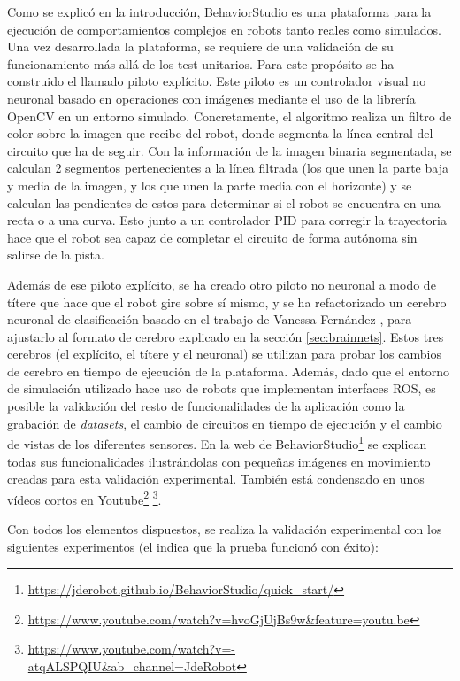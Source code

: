 Como se explicó en la introducción, BehaviorStudio es una plataforma para la ejecución de comportamientos complejos en robots tanto reales como simulados. Una vez desarrollada la plataforma, se requiere de una validación de su funcionamiento más allá de los test unitarios. Para este propósito se ha construido el llamado piloto explícito. Este piloto es un controlador visual no neuronal basado en operaciones con imágenes mediante el uso de la librería OpenCV en un entorno simulado. Concretamente, el algoritmo realiza un filtro de color sobre la imagen que recibe del robot, donde segmenta la línea central del circuito que ha de seguir. Con la información de la imagen binaria segmentada, se calculan 2 segmentos pertenecientes a la línea filtrada (los que unen la parte baja y media de la imagen, y los que unen la parte media con el horizonte) y se calculan las pendientes de estos para determinar si el robot se encuentra en una recta o a una curva. Esto junto a un controlador PID para corregir la trayectoria hace que el robot sea capaz de completar el circuito de forma autónoma sin salirse de la pista. 

Además de ese piloto explícito, se ha creado otro piloto no neuronal a modo de títere que hace que el robot gire sobre sí mismo, y se ha refactorizado un cerebro neuronal de clasificación basado en el trabajo de Vanessa Fernández \cite{vanessa}, para ajustarlo al formato de cerebro explicado en la sección \ref{sec:brainnets}. Estos tres cerebros (el explícito, el títere y el neuronal) se utilizan para probar los cambios de cerebro en tiempo de ejecución de la plataforma. Además, dado que el entorno de simulación utilizado hace uso de robots que implementan interfaces ROS, es posible la validación del resto de funcionalidades de la aplicación como la grabación de \textit{datasets}, el cambio de circuitos en tiempo de ejecución y el cambio de vistas de los diferentes sensores. En la web de BehaviorStudio\footnote{\url{https://jderobot.github.io/BehaviorStudio/quick_start/}} se explican todas sus funcionalidades ilustrándolas con pequeñas imágenes en movimiento creadas para esta validación experimental. También está condensado en unos vídeos cortos en Youtube\footnote{\url{https://www.youtube.com/watch?v=hvoGjUjBs9w&feature=youtu.be}} \footnote{\url{https://www.youtube.com/watch?v=-atqALSPQIU&ab_channel=JdeRobot}}.

Con todos los elementos dispuestos, se realiza la validación experimental con los siguientes experimentos (el \checkmark indica que la prueba funcionó con éxito):


